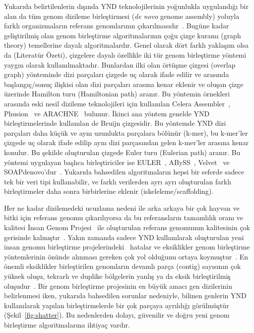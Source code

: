 \documentclass[11pt]{article}
\begin{document}
Yukarıda belirtilenlerin dışında YND teknolojilerinin yoğunlukla uygulandığı bir alan da tüm genom dizileme birleştirmesi ({\it de novo} genome assembly) yoluyla farklı organizmaların referans genomlarının çıkarılmasıdır~\cite{Schatz2010}. Bugüne kadar geliştirilmiş olan genom birleştirme algoritmalarının çoğu çizge kuramı (graph theory) temellerine dayalı algoritmalardır. Genel olarak dört farklı yaklaşım olsa da (Literatür Özeti), çizgelere dayalı özellikle  iki tür genom birleştirme yöntemi yaygın olarak kullanılmaktadır. Bunlardan ilki olan örtüşme çizgesi (overlap graph) yönteminde dizi parçaları çizgede uç olarak ifade edilir ve arasında başlangıç/sonuç ilişkisi olan dizi parçaları arasına kenar eklenir ve oluşan çizge üzerinde Hamilton turu (Hamiltonian path) aranır. Bu yöntemin örnekleri arasında eski nesil dizileme teknolojileri için kullanılan Celera Assembler~\cite{Myers2002}, Phusion~\cite{Mullikin2003} ve ARACHNE~\cite{Batzoglou2002} bulunur. İkinci ana yöntem genelde YND birleştirmelerinde kullanılan de Bruijn çizgesidir. Bu yöntemde YND dizi parçaları daha küçük ve aynı uzunlukta parçalara bölünür (k-mer), bu k-mer'ler çizgede uç olarak ifade edilip aynı dizi parçasından gelen k-mer'ler arasına kenar konulur. Bu şekilde oluşturulan çizgede Euler turu (Eulerian path) aranır. Bu yöntemi uygulayan başlıca birleştiriciler ise EULER~\cite{Chaisson2009}, ABySS~\cite{Simpson2009}, Velvet~\cite{Zerbino2008} ve SOAPdenovo'dur~\cite{Li2010b}. Yukarıda bahsedilen algoritmaların hepsi bir seferde sadece tek bir veri tipi kullanabilir, ve farklı verilerden ayrı ayrı oluşturulan farklı birleştirmeler daha sonra birbirlerine eklenir (iskeleleme/scaffolding).

Her ne kadar dizilemedeki ucuzlama nedeni ile arka arkaya bir çok hayvan ve bitki için referans genomu çıkarılıyorsa da bu referansların tamamlılık oranı ve kalitesi İnsan Genom Projesi~\cite{IHGSC2001} ile oluşturulan referans genomunun kalitesinin çok gerisinde kalmıştır~\cite{Schatz2010,Alkan2011b}. Yakın zamanda sadece YND kullanılarak oluşturulan yeni insan genomu birleştirme projelerindeki~\cite{Li2010b,Gnerre2011} hatalar ve eksiklikler genom birleştirme yöntemlerinin önünde alınması gereken çok yol olduğunu ortaya koymuştur~\cite{Alkan2011b}. En önemli eksiklikler birleştirilen genomların devamlı parça (contig) sayısının çok yüksek oluşu, tekrarlı ve duplike bölgelerin yanlış ya da eksik birleştirilmiş oluşudur~\cite{Alkan2011b}. Bir genom birleştirme projesinin en büyük amacı gen dizilerinin belirlenmesi iken, yukarıda bahsedilen sorunlar nedeniyle, bilinen genlerin YND kullanılarak yapılan birleştirmelerde bir çok parçaya ayrıldığı görülmüştür (Şekil~\ref{fig:shatter}). Bu nedenlerden dolayı, güvenilir ve doğru yeni genom birleştirme algoritmalarına ihtiyaç vardır.
\end{document}
